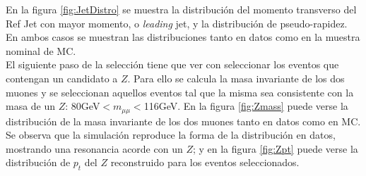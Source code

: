 En la figura \ref{fig:JetDistro} se muestra la distribución del momento transverso del Ref Jet con mayor momento, o \textit{leading} jet, y la distribución de pseudo-rapidez. En ambos casos se muestran las distribuciones tanto en datos como en la muestra nominal de MC.\\ 

El siguiente paso de la selección tiene que ver con seleccionar los eventos que contengan un candidato a $Z$. Para ello se calcula la masa invariante de los dos muones y se seleccionan aquellos eventos tal que la misma sea consistente con la masa de un $Z$: 80GeV$<m_{\mu \mu}<$116GeV. En la figura \ref{fig:Zmass} puede verse la distribución de la masa invariante de los dos muones tanto en datos como en MC. Se observa que la simulación reproduce la forma de la distribución en datos, mostrando una resonancia acorde con un $Z$; y en la figura \ref{fig:Zpt} puede verse la distribución de $p_t$ del $Z$ reconstruido para los eventos seleccionados. 

